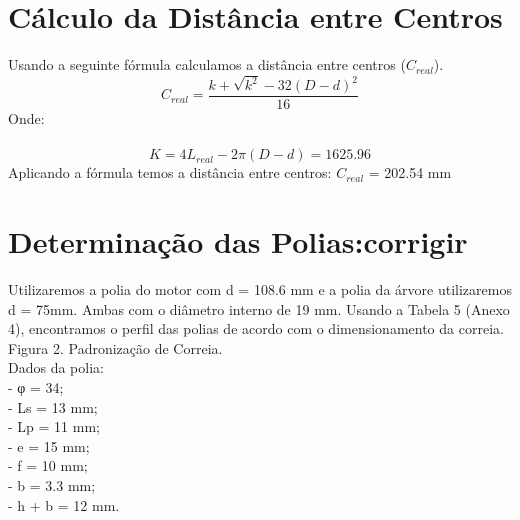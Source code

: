 \documentclass[11pt,a4paper]{report}
\begin{document}
\chapter{C\'alculo da Dist\^ancia entre Centros}
Usando a seguinte f\'ormula calculamos a dist\^ancia entre centros ($C_{real}$).\\
$$C_{real}=\frac{k+\sqrt{k^2}-32(D-d)^2}{16}$$
Onde:\\\\
$$K=4L_{real}-2\pi(D-d)=1625.96$$
Aplicando a f\'ormula temos a dist\^ancia entre centros: $C_{real}$ = 202.54 mm\\
\chapter{Determina\c{c}\~ao das Polias:corrigir}
Utilizaremos a polia do motor com d = 108.6 mm e a polia da \'arvore
utilizaremos d = 75mm. Ambas com o di\^ametro interno de 19 mm. Usando a Tabela
5 (Anexo 4), encontramos o perfil das polias de acordo com o dimensionamento da
correia.\\
Figura 2. Padronização de Correia.\\
Dados da polia:\\
- φ = 34;\\
- Ls = 13 mm;\\
- Lp = 11 mm;\\
- e = 15 mm;\\
- f = 10 mm;\\
- b = 3.3 mm;\\
- h + b = 12 mm.\\
\end{document}
